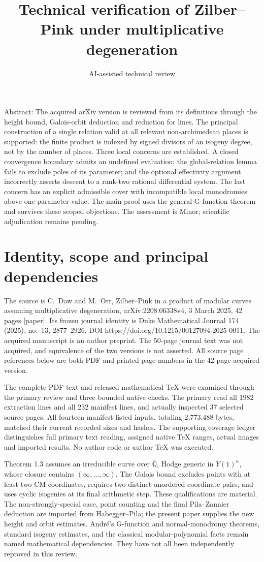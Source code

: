 \documentclass[10pt]{article}
\title{Technical verification of Zilber–Pink
under multiplicative degeneration}
\author{AI-assisted technical review}
\date{}
\begin{document}
\maketitle
Abstract: The acquired arXiv version is reviewed from its definitions through the height bound, Galois-orbit deduction and reduction for lines. The principal construction of a single relation valid at all relevant non-archimedean places is supported: the finite product is indexed by signed divisors of an isogeny degree, not by the number of places. Three local concerns are established. A closed convergence boundary admits an undefined evaluation; the global-relation lemma fails to exclude poles of its parameter; and the optional effectivity argument incorrectly asserts descent to a rank-two rational differential system. The last concern has an explicit admissible cover with incompatible local monodromies above one parameter value. The main proof uses the general G-function theorem and survives these scoped objections. The assessment is Minor; scientific adjudication remains pending.\par
\section*{Identity, scope and principal dependencies}
The source is C. Daw and M. Orr, Zilber–Pink in a product of modular curves assuming multiplicative degeneration, arXiv:2208.06338v4, 3 March 2025, 42 pages [paper]. Its frozen journal identity is Duke Mathematical Journal 174 (2025), no. 13, 2877–2926, DOI https://doi.org/10.1215/00127094-2025-0011. The acquired manuscript is an author preprint. The 50-page journal text was not acquired, and equivalence of the two versions is not asserted. All source page references below are both PDF and printed page numbers in the 42-page acquired version.\par
The complete PDF text and released mathematical TeX were examined through the primary review and three bounded native checks. The primary read all 1982 extraction lines and all 232 manifest lines, and actually inspected 37 selected source pages. All fourteen manifest-listed inputs, totaling 2,773,488 bytes, matched their current recorded sizes and hashes. The supporting coverage ledger distinguishes full primary text reading, assigned native TeX ranges, actual images and imported results. No author code or author TeX was executed.\par
Theorem 1.3 assumes an irreducible curve over \(\overline{\mathbb Q}\), Hodge generic in \(Y(1)^n\), whose closure contains \((\infty,\ldots,\infty)\). The Galois bound excludes points with at least two CM coordinates, requires two distinct unordered coordinate pairs, and uses cyclic isogenies at its final arithmetic step. These qualifications are material. The non-strongly-special case, point counting and the final Pila–Zannier deduction are imported from Habegger–Pila; the present paper supplies the new height and orbit estimates. André’s G-function and normal-monodromy theorems, standard isogeny estimates, and the classical modular-polynomial facts remain named mathematical dependencies. They have not all been independently reproved in this review.\par
\end{document}
